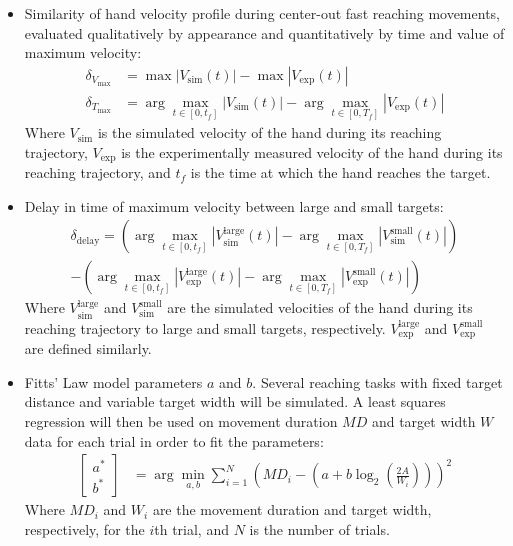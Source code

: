 \documentclass[table,12pt]{article}
\begin{document}
\begin{itemize}
    \item Similarity of hand velocity profile during center-out fast reaching movements, evaluated qualitatively by appearance and quantitatively by time and value of maximum velocity:
    \begin{align}
        \delta_{V_{\text{max}}} &= \max \left|V_{\text{sim}}(t)\right| - \max \left|V_{\text{exp}}(t)\right| \\
        \delta_{T_{\text{max}}} &= \arg\max_{t \in [0, t_f]} \left|V_{\text{sim}}(t)\right| - \arg\max_{t \in [0, T_f]} \left|V_{\text{exp}}(t)\right|
    \end{align}
    Where $V_{\text{sim}}$ is the simulated velocity of the hand during its reaching trajectory, $V_{\text{exp}}$ is the experimentally measured velocity of the hand during its reaching trajectory, and $t_f$ is the time at which the hand reaches the target.

    \item Delay in time of maximum velocity between large and small targets:
    \begin{multline*}
        \delta_{\text{delay}} = \left(\arg\max_{t \in [0, t_f]} \left|V_{\text{sim}}^{\text{large}}(t)\right| - \arg\max_{t \in [0, T_f]} \left|V_{\text{sim}}^{\text{small}}(t)\right|\right) \\
        - \left(\arg\max_{t \in [0, t_f]} \left|V_{\text{exp}}^{\text{large}}(t)\right| - \arg\max_{t \in [0, T_f]} \left|V_{\text{exp}}^{\text{small}}(t)\right|\right)
    \end{multline*}
    Where $V_{\text{sim}}^{\text{large}}$ and $V_{\text{sim}}^{\text{small}}$ are the simulated velocities of the hand during its reaching trajectory to large and small targets, respectively. $V_{\text{exp}}^{\text{large}}$ and $V_{\text{exp}}^{\text{small}}$ are defined similarly.
    \item Fitts' Law model parameters $a$ and $b$.
    Several reaching tasks with fixed target distance and variable target width will be simulated. A least squares regression will then be used on movement duration $MD$ and target width $W$ data for each trial in order to fit the parameters:
    \begin{align}
        \begin{bmatrix}
            a^* \\ b^*
        \end{bmatrix} &= \arg\min_{a, b} \sum_{i=1}^N \left(MD_i - \left(a + b \log_2\left(\frac{2A}{W_i}\right)\right)\right)^2
    \end{align}
    Where $MD_i$ and $W_i$ are the movement duration and target width, respectively, for the $i$th trial, and $N$ is the number of trials.
\end{itemize}
\end{document}

